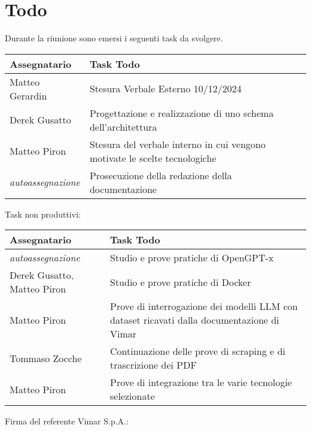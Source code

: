 \section{Todo}
Durante la riunione sono emersi i seguenti task da svolgere.

\begin{center}
  \begin{tabular}{|L{5cm}|L{8cm}|}
    \hline
    \textbf{Assegnatario} & \textbf{Task Todo} \\ \hline
    Matteo Gerardin   &  Stesura Verbale Esterno 10/12/2024\\ \hline
    Derek Gusatto & Progettazione e realizzazione di uno schema dell'architettura\\ \hline
    Matteo Piron & Stesura del verbale interno in cui vengono motivate le scelte tecnologiche\\ \hline
    \textit{autoassegnazione} & Prosecuzione della redazione della documentazione\\ \hline
  \end{tabular}
\end{center}

Task non produttivi:

\begin{center}
  \begin{tabular}{|L{5cm}|L{8cm}|}
    \hline
    \textbf{Assegnatario} & \textbf{Task Todo} \\ \hline
    \textit{autoassegnazione} & Studio e prove pratiche di OpenGPT-x\\ \hline
    Derek Gusatto, Matteo Piron & Studio e prove pratiche di Docker\\ \hline
    Matteo Piron & Prove di interrogazione dei modelli LLM con dataset ricavati dalla documentazione di Vimar\\ \hline
    Tommaso Zocche & Continuazione delle prove di scraping e di trascrizione dei PDF\\ \hline
    Matteo Piron & Prove di integrazione tra le varie tecnologie selezionate\\ \hline
  \end{tabular}
\end{center}
\vspace{4cm}
\noindent Firma del referente Vimar S.p.A.: \underline{\hspace{5cm}}